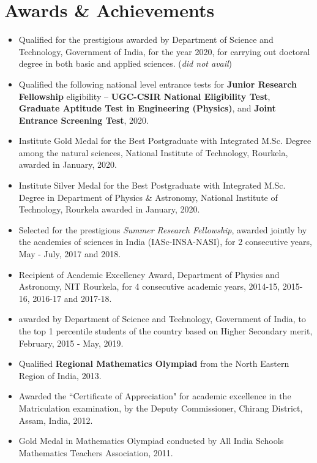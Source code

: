 \documentclass[11pt, letterpaper]{article}
\let\oldhref\href
\renewcommand{\href}[3][blue]{\oldhref{#2}{\color{#1}{#3}}}
\begin{document}
	\section{Awards \& Achievements}
	\begin{itemize}
		\renewcommand{\labelitemi}{\color{blue}$\scriptstyle{\lozenge}$}
		\item Qualified for the prestigious \href{https://online-inspire.gov.in/Account/INSPIREProgramme}{INSPIRE Fellowship} awarded by Department of Science and Technology, Government of India, for the year 2020, for carrying out doctoral degree in both basic and applied sciences. (\textit{did not avail})
		
		\item Qualified the following national level entrance tests for \textbf{Junior Research Fellowship} eligibility -- \textbf{UGC-CSIR National Eligibility Test}, \textbf{Graduate Aptitude Test in Engineering (Physics)}, and \textbf{Joint Entrance Screening Test}, 2020.
		
		\item Institute Gold Medal for the Best Postgraduate with Integrated M.Sc. Degree among the natural sciences, National Institute of Technology, Rourkela, awarded in January, 2020.
		
		\item Institute Silver Medal for the Best Postgraduate with Integrated M.Sc. Degree in Department of Physics \& Astronomy, National Institute of Technology, Rourkela awarded in January, 2020.
		
		\item Selected for the prestigious \emph{Summer Research Fellowship}, awarded jointly by the academies of sciences in India (IASc-INSA-NASI), for 2 consecutive years, May - July, 2017 and 2018.
		
		\item Recipient of Academic Excellency Award, Department of Physics and Astronomy, NIT Rourkela, for 4 consecutive academic years, 2014-15, 2015-16, 2016-17 and 2017-18.
		
		\item \href{https://online-inspire.gov.in/Account/INSPIREProgramme}{INSPIRE Scholarship} awarded by Department of Science and Technology, Government of India, to the top 1 percentile students of the country based on Higher Secondary merit, February, 2015 - May, 2019.
		
		\item Qualified \textbf{Regional Mathematics Olympiad} from the North Eastern Region of India, 2013.
		
		\item Awarded the ``Certificate of Appreciation" for academic excellence in the Matriculation examination, by the Deputy Commissioner, Chirang District, Assam, India, 2012.
		
		\item Gold Medal in Mathematics Olympiad conducted by All India Schools Mathematics Teachers Association, 2011.
	\end{itemize}
	
\end{document}
